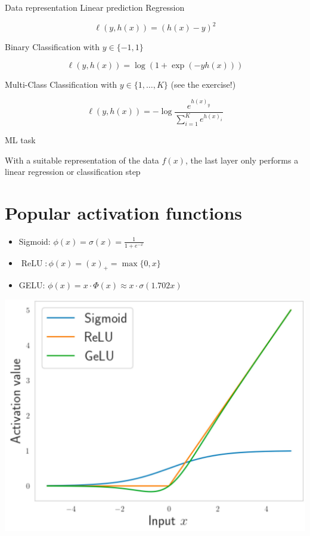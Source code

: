 \documentclass[10pt]{article}
\begin{document}
Data representation
Linear prediction
Regression

$$
\ell(y, h(x))=(h(x)-y)^{2}
$$

Binary Classification with $y \in\{-1,1\}$

$$
\ell(y, h(x))=\log (1+\exp (-y h(x)))
$$

Multi-Class Classification with $y \in\{1, \ldots, K\}$ (see the exercise!)

$$
\ell(y, h(x))=-\log \frac{e^{h(x)_{y}}}{\sum_{i=1}^{K} e^{h(x)_{i}}}
$$

ML task

With a suitable representation of the data $f(x)$, the last layer only performs a linear regression or classification step

\section*{Popular activation functions}
\begin{itemize}
  \item Sigmoid: $\phi(x)=\sigma(x)=\frac{1}{1+e^{-x}}$

  \item $\operatorname{ReLU}: \phi(x)=(x)_{+}=\max \{0, x\}$

  \item GELU: $\phi(x)=x \cdot \Phi(x) \approx x \cdot \sigma(1.702 x)$

\end{itemize}

\begin{center}
\includegraphics[max width=\textwidth]{2024_01_08_0e0dcffe4bc8c6049046g-13}
\end{center}
\end{document}
